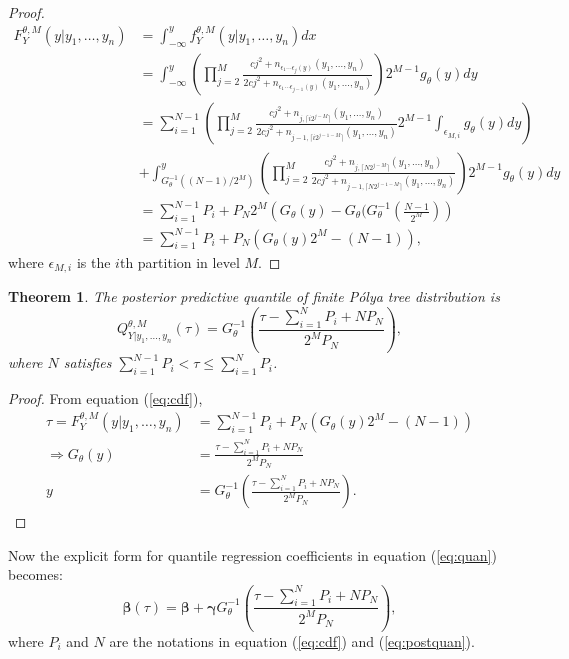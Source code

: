 \documentclass[12pt]{article}
\newtheorem{thm}{Theorem}[section]
\newcommand{\polya}{P\'{o}lya}
\begin{document}
\begin{proof}
  \begin{align*}
    F^{\theta,M}_Y(y| y_1, \ldots, y_n) & = \int_{-\infty}^y
    f_Y^{\theta,M} (y|y_1, \ldots, y_n) dx \\
    & = \int_{-\infty}^y \left( \prod_{j=2}^M \frac{cj^2 +
        n_{\epsilon_1 \cdots \epsilon_j(y) }(y_1, \ldots, y_n)}{2cj^2
        + n_{\epsilon_1 \cdots \epsilon_{j-1}(y)}(y_1, \ldots, y_n)}
    \right)2^{M-1} g_\theta(y) dy \\
    & = \sum_{i=1}^{N-1} \left( \prod_{j=2}^M \frac{cj^2 + n_{j,
          \lceil i2^{j-M} \rceil}(y_1, \ldots, y_n)}{2cj^2 + n_{j-1,
          \lceil i2^{j-1-M} \rceil}(y_1, \ldots, y_n)} 2^{M-1}
      \int_{\epsilon_{M,i}} g_{\theta}(y) dy \right) \\
    &+ \int_{G^{-1}_{\theta}((N-1)/2^M)}^y \left( \prod_{j=2}^M
      \frac{cj^2 + n_{j, \lceil N2^{j-M} \rceil}(y_1, \ldots,
        y_n)}{2cj^2 + n_{j-1, \lceil N2^{j-1-M} \rceil}(y_1, \ldots,
        y_n)}\right) 2^{M-1}
    g_{\theta}(y) dy \\
    & = \sum_{i=1}^{N-1} P_i + P_N 2^M \left( G_{\theta}(y) -
      G_{\theta}(G_{\theta}^{-1}\left( \frac{N-1}{2^M} \right)\right)\\
    & = \sum_{i=1}^{N-1}P_i + P_N \left( G_{\theta}(y) 2^M - (N-1)
    \right),
  \end{align*}
  where $\epsilon_{M,i}$ is the $i$th partition in level $M$.
\end{proof}

\begin{thm}
  The posterior predictive quantile of finite \polya{} tree
  distribution is
  \begin{equation}
    \label{eq:postquan}
    Q^{\theta, M}_{Y|y_1, \ldots, y_n}(\tau) = G^{-1}_{\theta} \left(
      \frac{\tau- \sum_{i=1}^N P_i + N P_N}{2^M P_N} \right),
  \end{equation}
  where $N$ satisfies $ \sum_{i=1}^{N-1} P_i < \tau \le \sum_{i=1}^N
  P_i$.
\end{thm}

\begin{proof}
  From equation (\ref{eq:cdf}),
  \begin{align*}
    \tau = F^{\theta,M}_Y(y|y_1, \ldots, y_n) &= \sum_{i=1}^{N-1}
    P_{i} + P_N
    \left( G_{\theta}(y)2^M -(N-1) \right) \\
    \Rightarrow G_{\theta}(y) &= \frac{\tau - \sum_{i=1}^NP_i +
      NP_N}{2^MP_N} \\
    y & = G_{\theta}^{-1} \left(\frac{\tau - \sum_{i=1}^NP_i +
        NP_N}{2^MP_N} \right).
  \end{align*}
\end{proof}
Now the explicit form for quantile regression coefficients in equation
(\ref{eq:quan}) becomes:
\begin{equation}
  \label{eq:newquan}
  \bm{\beta}(\tau) = \bm{\beta} + \bm{\gamma}G_{\theta}^{-1}
  \left(\frac{\tau - \sum_{i=1}^NP_i +
      NP_N}{2^MP_N}  \right),
\end{equation}
where $P_i$ and $N$ are the notations in equation (\ref{eq:cdf}) and
(\ref{eq:postquan}).
\end{document}
